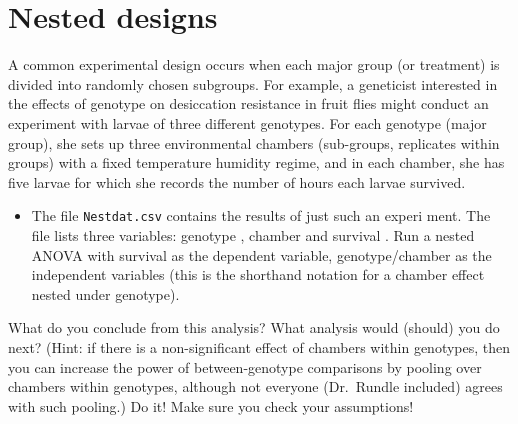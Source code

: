 \documentclass[
  12pt,
]{book}
\newenvironment{Shaded}{\begin{snugshade}}{\end{snugshade}}
\newcommand{\DataTypeTok}[1]{\textcolor[rgb]{0.13,0.29,0.53}{#1}}
\newcommand{\KeywordTok}[1]{\textcolor[rgb]{0.13,0.29,0.53}{\textbf{#1}}}
\newcommand{\NormalTok}[1]{#1}
\newcommand{\OperatorTok}[1]{\textcolor[rgb]{0.81,0.36,0.00}{\textbf{#1}}}
\newcommand{\StringTok}[1]{\textcolor[rgb]{0.31,0.60,0.02}{#1}}
\providecommand{\tightlist}{%
  \setlength{\itemsep}{0pt}\setlength{\parskip}{0pt}}
\begin{document}
\hypertarget{nested-designs}{%
\section{Nested designs}\label{nested-designs}}

A common experimental design occurs when each major group (or treatment) is divided into randomly chosen subgroups. For example, a geneticist interested in the effects of genotype on desiccation resistance in fruit flies might conduct an experiment with larvae of three different genotypes. For each genotype (major group), she sets up three environmental chambers (sub-groups, replicates within groups) with a fixed temperature humidity regime, and in each chamber, she has five larvae for which she records the number of hours each larvae survived.

\begin{itemize}
\tightlist
\item
  The file \texttt{Nestdat.csv} contains the results of just such an experi ment. The file lists three variables: genotype , chamber and survival . Run a nested ANOVA with survival as the dependent variable, genotype/chamber as the independent variables (this is the shorthand notation for a chamber effect nested under genotype).
\end{itemize}

\begin{Shaded}
\end{Shaded}

What do you conclude from this analysis? What analysis would (should) you do next? (Hint: if there is a non-significant effect of chambers within genotypes, then you can increase the power of between-genotype comparisons by pooling over chambers within genotypes, although not everyone (Dr.~Rundle included) agrees with such pooling.) Do it! Make sure you check your assumptions!
\end{document}
